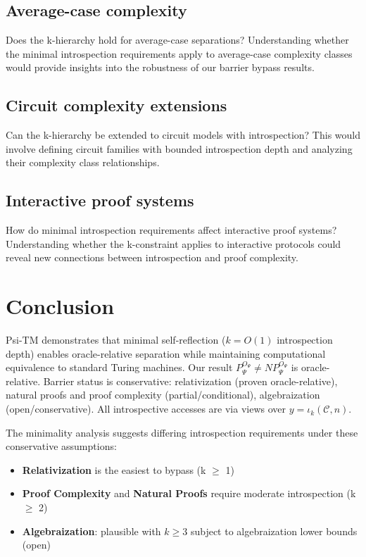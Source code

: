 \documentclass[11pt]{article}
\theoremstyle{definition}
\begin{document}
\subsection{Average-case complexity}
Does the k-hierarchy hold for average-case separations? Understanding whether the minimal introspection requirements apply to average-case complexity classes would provide insights into the robustness of our barrier bypass results.

\subsection{Circuit complexity extensions}
Can the k-hierarchy be extended to circuit models with introspection? This would involve defining circuit families with bounded introspection depth and analyzing their complexity class relationships.

\subsection{Interactive proof systems}
How do minimal introspection requirements affect interactive proof systems? Understanding whether the k-constraint applies to interactive protocols could reveal new connections between introspection and proof complexity.

\section{Conclusion}

Psi-TM demonstrates that minimal self-reflection ($k = O(1)$ introspection depth) enables oracle-relative separation while maintaining computational equivalence to standard Turing machines. Our result $P^{O_\Psi}_\Psi \neq NP^{O_\Psi}_\Psi$ is oracle-relative. Barrier status is conservative: relativization (proven oracle-relative), natural proofs and proof complexity (partial/conditional), algebraization (open/conservative). All introspective accesses are via views over $y=\iota_k(\mathcal{C},n)$.

The minimality analysis suggests differing introspection requirements under these conservative assumptions:
\begin{itemize}
\item \textbf{Relativization} is the easiest to bypass (k $\geq$ 1)
\item \textbf{Proof Complexity} and \textbf{Natural Proofs} require moderate introspection (k $\geq$ 2)
\item \textbf{Algebraization}: plausible with $k \geq 3$ subject to algebraization lower bounds (open)
\end{itemize}
\end{document}
